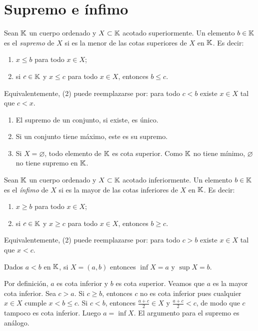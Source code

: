 \section{Supremo e ínfimo}

\begin{definition}[Supremo]
  Sean \(\mathbb{K}\) un cuerpo ordenado y \(X \subset \mathbb{K}\) acotado superiormente. Un elemento \(b \in \mathbb{K}\) es el \emph{supremo} de \(X\) si es la menor de las cotas superiores de \(X\) en \(\mathbb{K}\). Es decir:
  \begin{enumerate}[label=(\arabic*)]
    \item \(x \leq b\) para todo \(x \in X\);
    \item si \(c \in \mathbb{K}\) y \(x \leq c\) para todo \(x \in X\), entonces \(b \leq c\).
  \end{enumerate}
  Equivalentemente, (2) puede reemplazarse por: para todo \(c < b\) existe \(x \in X\) tal que \(c < x\).
\end{definition}

\begin{note}
  \begin{enumerate}[label=(\arabic*)]
    \item El supremo de un conjunto, si existe, es único.
    \item Si un conjunto tiene máximo, este es su supremo.
    \item Si \(X = \varnothing\), todo elemento de \(\mathbb{K}\) es cota superior. Como \(\mathbb{K}\) no tiene mínimo, \(\varnothing\) no tiene supremo en \(\mathbb{K}\).
  \end{enumerate}
\end{note}

\begin{definition}[Ínfimo]
  Sean \(\mathbb{K}\) un cuerpo ordenado y \(X \subset \mathbb{K}\) acotado inferiormente. Un elemento \(b \in \mathbb{K}\) es el \emph{ínfimo} de \(X\) si es la mayor de las cotas inferiores de \(X\) en \(\mathbb{K}\). Es decir:
  \begin{enumerate}[label=(\arabic*)]
    \item \(x \geq b\) para todo \(x \in X\);
    \item si \(c \in \mathbb{K}\) y \(x \geq c\) para todo \(x \in X\), entonces \(b \geq c\).
  \end{enumerate}
  Equivalentemente, (2) puede reemplazarse por: para todo \(c > b\) existe \(x \in X\) tal que \(x < c\).
\end{definition}

\begin{eg}
  Dados \(a < b\) en \(\mathbb{K}\), si \(X = (a, b)\) entonces \(\inf X = a\) y \(\sup X = b\).

  Por definición, \(a\) es cota inferior y \(b\) es cota superior. Veamos que \(a\) es la mayor cota inferior. Sea \(c > a\). Si \(c \geq b\), entonces \(c\) no es cota inferior pues cualquier \(x \in X\) cumple \(x < b \leq c\). Si \(c < b\), entonces \(\frac{a + c}{2} \in X\) y \(\frac{a + c}{2} < c\), de modo que \(c\) tampoco es cota inferior. Luego \(a = \inf X\). El argumento para el supremo es análogo.
\end{eg}

